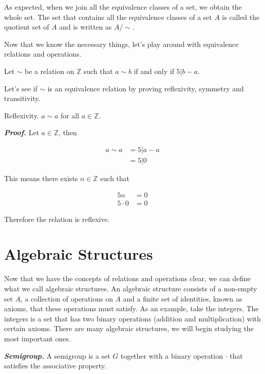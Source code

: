 \documentclass{report}
\begin{document}
    As expected, when we join all the equivalence classes of a set, we obtain the whole set. The set that contains all the equivalence classes of a set $A$ is called the quotient set of $A$ and is written as $A/\sim$.

    Now that we know the necessary things, let's play around with equivalence relations and operations.

    Let $\sim$ be a relation on $\mathbb{Z}$ such that $a \sim b$ if and only if $5|b-a$.

    Let's see if $\sim$ is an equivalence relation by proving reflexivity, symmetry and transitivity.

    Reflexivity. $a \sim a$ for all $a \in \mathbb{Z}$.

    \textit{\textbf{Proof.}} Let $a \in \mathbb{Z}$, then

    \begin{align*}
        a \sim a &= 5|a-a\\
        &= 5|0
    \end{align*}

    This means there exists $n \in \mathbb{Z}$ such that

    \begin{align*}
        5n &= 0\\
        5\cdot 0 &= 0
    \end{align*}

    Therefore the relation is reflexive.

    \section{Algebraic Structures}

    Now that we have the concepts of relations and operations clear, we can define what we call algebraic structures. An algebraic structure consists of a non-empty set $A$, a collection of operations on $A$ and a finite set of identities, known as axioms, that these operations must satisfy. As an example, take the integers. The integers is a set that has two binary operations (addition and multiplication) with certain axioms. There are many algebraic structures, we will begin studying the most important ones.

    \begin{defBox}
        \textit{\textbf{Semigroup.}} A semigroup is a set $G$ together with a binary operation $\cdot$ that satisfies the associative property.
    \end{defBox}
\end{document}
